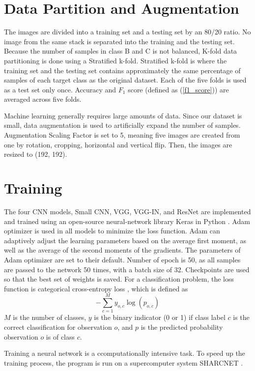 \section{Data Partition and Augmentation}
\label{result_aug}

The images are divided into a training set and a testing set by an 80/20 ratio. No image from the same stack is separated into the training and the testing set. Because the number of samples in class B and C is not balanced, K-fold data partitioning is done using a Stratified k-fold. Stratified k-fold is where the training set and the testing set contains approximately the same percentage of samples of each target class as the original dataset. Each of the five folds is used as a test set only once. Accuracy and $F_1$ score (defined as (\ref{f1_score})) are averaged across five folds.

Machine learning generally requires large amounts of data. Since our dataset is small, data augmentation is used to artificially expand the number of samples. Augmentation Scaling Factor is set to 5, meaning five images are created from one by rotation, cropping, horizontal and vertical flip. Then, the images are resized to (192, 192).

\section{Training}
\label{result_training}

The four CNN models, Small CNN, VGG, VGG-IN, and ResNet are implemented and trained using an open-source neural-network library Keras \citep{chollet2015keras} in Python \citep{van1995python}. Adam \citep{adam} optimizer is used in all models to minimize the loss function. Adam can adaptively adjust the learning parameters based on the average first moment, as well as the average of the second moments of the gradients. The parameters of Adam optimizer are set to their default. Number of epoch is 50, as all samples are passed to the network 50 times, with a batch size of 32. Checkpoints are used so that the best set of weights is saved. For a classification problem, the loss function is categorical cross-entropy loss \citep{Goodfellow-et-al-2016}, which is defined as $$-\sum^M_{c=1} y_{o,c}\log(p_{o,c})$$
$M$ is the number of classes, $y$ is the binary indicator (0 or 1) if class label $c$ is the correct classification for observation $o$, and $p$ is the predicted probability observation $o$ is of class $c$. 

Training a neural network is a ccomputationally intensive task. To speed up the training process, the program is run on a supercomputer system SHARCNET \citep{sharcnet}.

